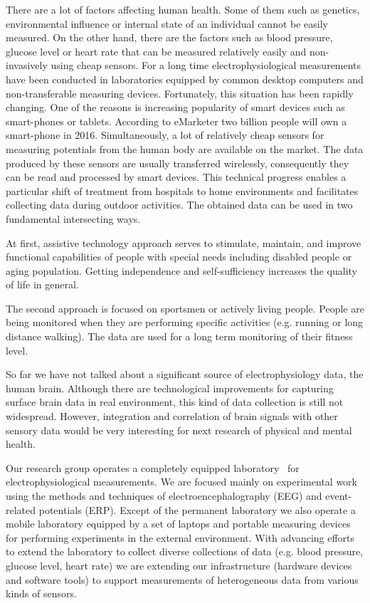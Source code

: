 \documentclass[a4paper,twoside]{article}
\begin{document}
\noindent
There are a lot of factors affecting human health. Some of them such as genetics, environmental influence or internal state of an individual cannot be easily measured. On the other hand, there are the factors such as blood pressure, glucose level or heart rate that can be measured relatively easily and non-invasively using cheap sensors. For a long time electrophysiological measurements have been conducted in laboratories equipped by common desktop computers and non-transferable measuring devices. Fortunately, this situation has been rapidly changing. One of the reasons is increasing popularity of smart devices such as smart-phones or tablets. According to eMarketer \cite{emark} two billion people will own a smart-phone in 2016. Simultaneously, a lot of relatively cheap sensors for measuring potentials from the human body are available on the market. The data produced by these sensors are usually transferred wirelessly, consequently they can be read and processed by smart devices. This technical progress enables a particular shift of treatment from hospitals to home environments and facilitates collecting data during outdoor activities. The obtained data can be used in two fundamental intersecting ways.

At first, assistive technology approach serves to stimulate, maintain, and improve functional capabilities of people with special needs including disabled people or aging population. Getting independence and self-sufficiency increases the quality of life in general.

The second approach is focused on sportsmen or actively living people. People are being monitored when they are performing specific activities (e.g. running or long distance walking). The data are used for a long term monitoring of their fitness level.

So far we have not talked about a significant source of electrophysiology data, the human brain. Although there are technological improvements for capturing surface brain data in real environment, this kind of data collection is still not widespread. However, integration and correlation of brain signals with other sensory data would be very interesting for next research of physical and mental health. 

Our research group operates a completely equipped laboratory~\cite{10.3389/fninf.2014.00020} for electrophysiological measurements. We are focused mainly on experimental work using the methods and techniques of electroencephalography (EEG) and event-related potentials (ERP). Except of the permanent laboratory we also operate a mobile laboratory equipped by a set of laptops and portable measuring devices for performing experiments in the external environment. With advancing efforts to extend the laboratory to collect diverse collections of data (e.g. blood pressure, glucose level, heart rate) we are extending our infrastructure (hardware devices and software tools) to support  measurements of heterogeneous data from various kinds of sensors.
\end{document}
